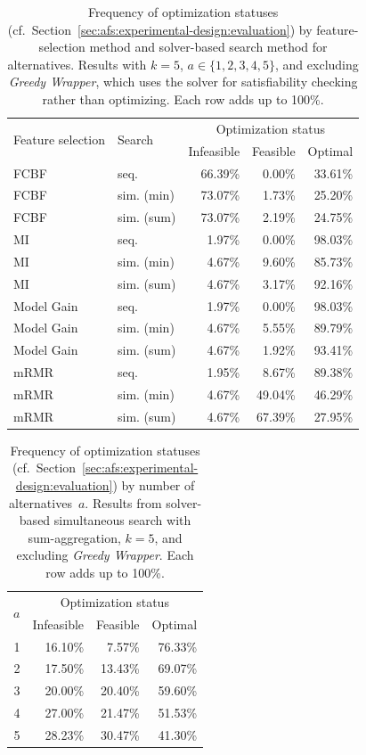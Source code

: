 \documentclass{article}
\theoremstyle{definition}
\begin{document}
\begin{table}[t]
	\centering
	\begin{tabular}{llrrr}
		\toprule
		\multirow{2}{*}{Feature selection} & \multirow{2}{*}{Search} & \multicolumn{3}{c}{Optimization status} \\
		\cmidrule(r){3-5}
		& & Infeasible & Feasible & Optimal \\
		\midrule
		FCBF & seq. & 66.39\% & 0.00\% & 33.61\% \\
		FCBF & sim. (min) & 73.07\% & 1.73\% & 25.20\% \\
		FCBF & sim. (sum) & 73.07\% & 2.19\% & 24.75\% \\
		MI & seq. & 1.97\% & 0.00\% & 98.03\% \\
		MI & sim. (min) & 4.67\% & 9.60\% & 85.73\% \\
		MI & sim. (sum) & 4.67\% & 3.17\% & 92.16\% \\
		Model Gain & seq. & 1.97\% & 0.00\% & 98.03\% \\
		Model Gain & sim. (min) & 4.67\% & 5.55\% & 89.79\% \\
		Model Gain & sim. (sum) & 4.67\% & 1.92\% & 93.41\% \\
		mRMR & seq. & 1.95\% & 8.67\% & 89.38\% \\
		mRMR & sim. (min) & 4.67\% & 49.04\% & 46.29\% \\
		mRMR & sim. (sum) & 4.67\% & 67.39\% & 27.95\% \\
		\bottomrule
	\end{tabular}
	\caption{
		Frequency of optimization statuses (cf.~Section~\ref{sec:afs:experimental-design:evaluation}) by feature-selection method and solver-based search method for alternatives.
		Results with $k=5$, $a \in \{1,2,3,4,5\}$, and excluding \emph{Greedy Wrapper}, which uses the solver for satisfiability checking rather than optimizing.
		Each row adds up to 100\%.
	}
	\label{tab:afs:impact-search-fs-method-optimization-status}
\end{table}

\begin{table}[t]
	\centering
	\begin{tabular}{rrrr}
		\toprule
		\multirow{2}{*}{$a$} & \multicolumn{3}{c}{Optimization status} \\
		\cmidrule(r){2-4}
		& Infeasible & Feasible & Optimal \\
		\midrule
		1 & 16.10\% & 7.57\% & 76.33\% \\
		2 & 17.50\% & 13.43\% & 69.07\% \\
		3 & 20.00\% & 20.40\% & 59.60\% \\
		4 & 27.00\% & 21.47\% & 51.53\% \\
		5 & 28.23\% & 30.47\% & 41.30\% \\
		\bottomrule
	\end{tabular}
	\caption{
		Frequency of optimization statuses (cf.~Section~\ref{sec:afs:experimental-design:evaluation}) by number of alternatives~$a$.
		Results from solver-based simultaneous search with sum-aggregation, $k=5$, and excluding \emph{Greedy Wrapper}.
		Each row adds up to 100\%.
	}
	\label{tab:afs:impact-num-alternatives-optimization-status}
\end{table}
\end{document}
